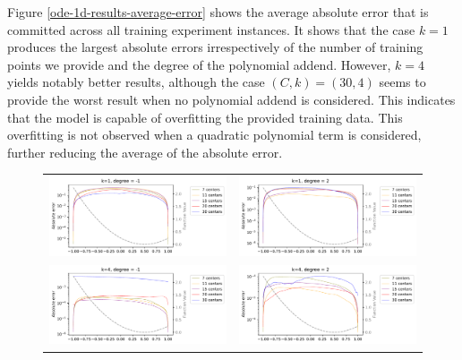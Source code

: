 \documentclass[12pt]{report} %
\begin{document}
Figure \ref{ode-1d-results-average-error} shows the average absolute error that is committed across all training experiment instances. It shows that the case $k=1$ produces the largest absolute errors irrespectively of the number of training points we provide and the degree of the polynomial addend. However, $k=4$ yields notably better results, although the case $(C,k)=(30,4)$ seems to provide the worst result when no polynomial addend is considered. This indicates that the model is capable of overfitting the provided training data. This overfitting is not observed when a quadratic polynomial term is considered, further reducing the average of the absolute error.

\begin{figure}
  \hspace*{-2.5cm}
  \begin{tabular}{cc}
    {\includegraphics[width=.65\textwidth, clip=true,trim={0 0 3.5cm 0}]{imagenes/experiments/1d/ode/ode_30_1_-1.pdf}} & {\includegraphics[width=.65\textwidth, clip=true,trim={0 0 3.5cm 0}]{imagenes/experiments/1d/ode/ode_30_1_2.pdf}} \\
    {\includegraphics[width=.65\textwidth, clip=true,trim={0 0 3.5cm 0}]{imagenes/experiments/1d/ode/ode_30_4_-1.pdf}} & {\includegraphics[width=.65\textwidth, clip=true,trim={0 0 3.5cm 0}]{imagenes/experiments/1d/ode/ode_30_4_2.pdf}}   \\

\end{tabular}
\end{figure}
\end{document}
